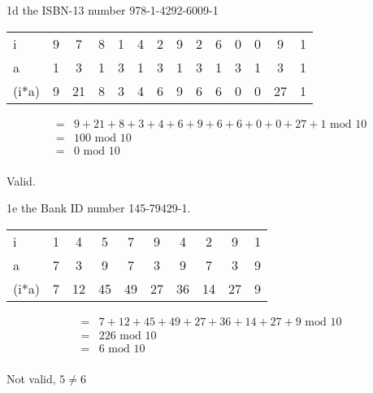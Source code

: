 \begin{question}{1d} %
the ISBN-13 number 978-1-4292-6009-1

\begin{tabular}{l|ccccccccccccc}
\hline
i     & 9  & 7  & 8  & 1  & 4  & 2  & 9  & 2  & 6  & 0 & 0 & 9 & 1\\
a     & 1  & 3  & 1  & 3  & 1  & 3  & 1  & 3  & 1  & 3 & 1 & 3 & 1 \\ 
\hline
(i*a) & 9  & 21 & 8  & 3  & 4  & 6  & 9  & 6  & 6  & 0 & 0 & 27 & 1
\end{tabular}

\begin{align*}
=& 9  + 21 + 8  + 3  + 4  + 6  + 9  + 6  + 6  + 0 + 0 + 27 + 1 \textrm{ mod } 10 \\
=& 100 \textrm{ mod } 10 \\
=& 0 \textrm{ mod } 10 \\
\end{align*}

Valid.
\end{question}


\begin{question}{1e} %
the Bank ID number 145-79429-1.

\begin{tabular}{l|ccccccccc}
\hline
i     & 1  & 4  & 5  & 7  & 9  & 4  & 2  & 9  & 1 \\
a     & 7  & 3  & 9  & 7  & 3  & 9  & 7  & 3  & 9 \\ 
\hline
(i*a) & 7  & 12 & 45 & 49 & 27 & 36 & 14 & 27 & 9
\end{tabular}

\begin{align*}
=& 7  + 12 + 45 + 49 + 27 + 36 + 14 + 27 + 9 \textrm{ mod } 10\\
=& 226 \textrm{ mod } 10\\
=& 6 \textrm{ mod } 10\\
\end{align*}

Not valid, $5 \neq 6$
\end{question}


